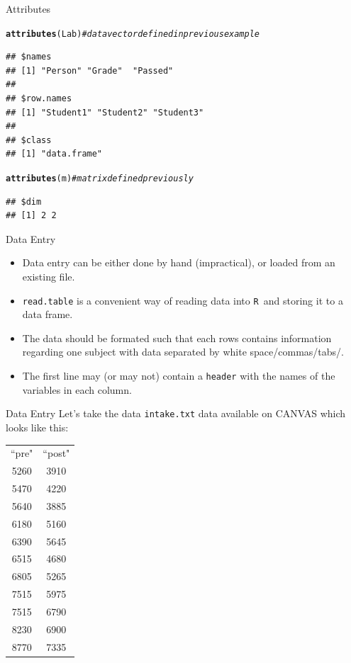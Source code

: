 \documentclass[xcolor=svgnames, 10pt]{beamer}
\makeatletter
\newcommand{\R}{{\tt R }}
\newcommand{\hlcom}[1]{\textcolor[rgb]{0.678,0.584,0.686}{\textit{#1}}}%
\newcommand{\hlstd}[1]{\textcolor[rgb]{0.345,0.345,0.345}{#1}}%
\newcommand{\hlkwd}[1]{\textcolor[rgb]{0.737,0.353,0.396}{\textbf{#1}}}%
\newenvironment{kframe}{%
 \def\at@end@of@kframe{}%
 \ifinner\ifhmode%
  \def\at@end@of@kframe{\end{minipage}}%
  \begin{minipage}{\columnwidth}%
 \fi\fi%
 \def\FrameCommand##1{\hskip\@totalleftmargin \hskip-\fboxsep
 \colorbox{shadecolor}{##1}\hskip-\fboxsep
     \hskip-\linewidth \hskip-\@totalleftmargin \hskip\columnwidth}%
 \MakeFramed {\advance\hsize-\width
   \@totalleftmargin\z@ \linewidth\hsize
   \@setminipage}}%
 {\par\unskip\endMakeFramed%
 \at@end@of@kframe}
\newenvironment{knitrout}{}{} %
\makeatother
\begin{document}
\begin{frame}[fragile]{Attributes}
\begin{knitrout}\footnotesize
{}\color{fgcolor}\begin{kframe}
\begin{alltt}
\hlkwd{attributes}\hlstd{(Lab)} \hlcom{# data vector defined in previous example}
\end{alltt}
\begin{verbatim}
## $names
## [1] "Person" "Grade"  "Passed"
## 
## $row.names
## [1] "Student1" "Student2" "Student3"
## 
## $class
## [1] "data.frame"
\end{verbatim}
\begin{alltt}
\hlkwd{attributes}\hlstd{(m)} \hlcom{# matrix defined previously}
\end{alltt}
\begin{verbatim}
## $dim
## [1] 2 2
\end{verbatim}
\end{kframe}
\end{knitrout}
\end{frame}



\begin{frame}{Data Entry}
\begin{itemize}
\item Data entry can be either done by hand (impractical), or loaded from an existing file. 
\item  {\tt read.table} is a convenient way of reading data into \R and storing it to a data frame.
\item The data should be formated such that each rows contains information regarding one subject with data separated by white space/commas/tabs/.
\item The first line may (or may not) contain a {\tt header} with the names of the variables in each column.
\end{itemize}
\end{frame}

\begin{frame}[fragile]{Data Entry}
Let's take the data {\tt intake.txt} data available on CANVAS which looks like this:
\begin{center}
\begin{tabular}{ c c  }
``pre" &  ``post" \\
5260 &3910\\
5470 &4220\\
5640 &3885\\
6180 &5160\\
6390 &5645\\
6515 &4680\\
6805 &5265\\
7515& 5975\\
7515 &6790\\
8230& 6900\\
8770& 7335 \\
\end{tabular}
\end{center}
\end{frame}
\end{document}
